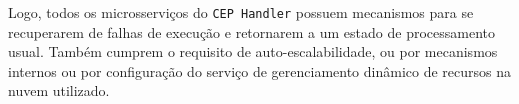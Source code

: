 
Logo, todos os microsserviços do \texttt{CEP Handler} possuem mecanismos para se recuperarem de falhas de execução e retornarem a um estado de processamento usual.  Também cumprem o requisito de auto-escalabilidade, ou por mecanismos internos ou por configuração do serviço de gerenciamento dinâmico de recursos na nuvem utilizado. 





